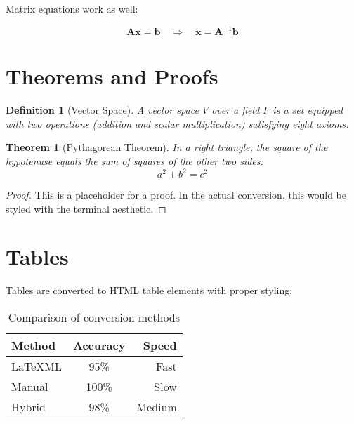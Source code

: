 \documentclass{article}
\begin{document}
Matrix equations work as well:

\begin{equation}
\mathbf{A}\mathbf{x} = \mathbf{b}
\quad \Rightarrow \quad
\mathbf{x} = \mathbf{A}^{-1}\mathbf{b}
\end{equation}

\section{Theorems and Proofs}

\newtheorem{theorem}{Theorem}
\newtheorem{lemma}{Lemma}
\newtheorem{definition}{Definition}

\begin{definition}[Vector Space]
A vector space $V$ over a field $F$ is a set equipped with two operations (addition and scalar multiplication) satisfying eight axioms.
\end{definition}

\begin{theorem}[Pythagorean Theorem]
In a right triangle, the square of the hypotenuse equals the sum of squares of the other two sides:
\begin{equation}
a^2 + b^2 = c^2
\end{equation}
\end{theorem}

\begin{proof}
This is a placeholder for a proof. In the actual conversion, this would be styled with the terminal aesthetic.
\end{proof}

\section{Tables}

Tables are converted to HTML table elements with proper styling:

\begin{table}[h]
\centering
\begin{tabular}{|l|c|r|}
\hline
\textbf{Method} & \textbf{Accuracy} & \textbf{Speed} \\
\hline
LaTeXML & 95\% & Fast \\
Manual & 100\% & Slow \\
Hybrid & 98\% & Medium \\
\hline
\end{tabular}
\caption{Comparison of conversion methods}
\label{tab:methods}
\end{table}
\end{document}

